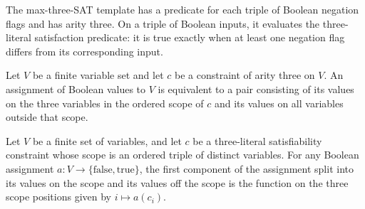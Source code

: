\begin{definition}
\label{FABL.maxE3SatTemplate}
\leanok
{}
The max-three-SAT template has a predicate for each triple of Boolean negation flags and
has arity three. On a triple of Boolean inputs, it evaluates the three-literal
satisfaction predicate: it is true exactly when at least one negation flag differs from
its corresponding input.
\end{definition}

\begin{definition}
\label{FABL.e3SatScopeSplitEquiv}
\leanok
{}
Let $V$ be a finite variable set and let $c$ be a constraint of arity three on $V$. An
assignment of Boolean values to $V$ is equivalent to a pair consisting of its values on
the three variables in the ordered scope of $c$ and its values on all variables outside
that scope.
\end{definition}

\begin{theorem}
\label{FABL.e3SatScopeSplitEquiv_fst_apply}
\leanok
{}
Let $V$ be a finite set of variables, and let $c$ be a three-literal satisfiability
constraint whose scope is an ordered triple of distinct variables. For any Boolean
assignment $a:V\to\{\mathrm{false},\mathrm{true}\}$, the first component of the
assignment split into its values on the scope and its values off the scope is the
function on the three scope positions given by $i\mapsto a(c_i)$.
\end{theorem}

